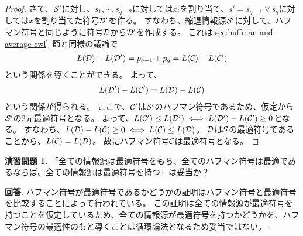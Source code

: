 \documentclass[pdflatex, ja=standard, a4paper]{bxjsarticle}
\theoremstyle{definition}
\newtheorem{problem}{演習問題}
\newenvironment{answer}{\noindent\textbf{回答}.}{\hfill$\square$}
\newcommand{\secref}[1]{\ref{#1}~節}
\begin{document}
\begin{proof}
    さて、$\mathcal{S}'$に対し、$s_1, \cdots, s_{q - 2}$に対しては$x_i$を割り当て、$s' = s_{q - 1} \lor s_q$に対しては$x$を割り当てた符号$\mathcal{D}'$を作る。
    すなわち、縮退情報源$\mathcal{S}'$に対して、ハフマン符号と同じように符号$\mathcal{D}$から$\mathcal{D}'$を作成する。
    これは\secref{sec:huffman-and-average-cwl}と同様の議論で
    \begin{align*}
        L(\mathcal{D}) - L(\mathcal{D}') = p_{q - 1} + p_q = L(\mathcal{C}) - L(\mathcal{C}')
    \end{align*}
    という関係を導くことができる。
    よって、
    \begin{align*}
        L(\mathcal{D}') - L(\mathcal{C}') = L(\mathcal{D}) - L(\mathcal{C})
    \end{align*}
    という関係が得られる。
    ここで、$\mathcal{C}'$は$\mathcal{S}'$のハフマン符号であるため、仮定から$\mathcal{S}'$の2元最適符号となる。
    よって、$L(\mathcal{C}') \leq L(\mathcal{D}') \iff L(\mathcal{D}') - L(\mathcal{C}') \geq 0$となる。
    すなわち、$L(\mathcal{D}) - L(\mathcal{C}) \geq 0 \iff L(\mathcal{C}) \leq L(\mathcal{D})$。
    $\mathcal{D}$は$\mathcal{S}$の最適符号であることから、$L(\mathcal{C}) = L(\mathcal{D})$。
    故にハフマン符号$\mathcal{C}$は最適符号となる。
\end{proof}

\begin{problem}
    「全ての情報源は最適符号をもち、全てのハフマン符号は最適であるならば、全ての情報源は最適符号を持つ」は妥当か？
\end{problem}
\begin{answer}
    ハフマン符号が最適符号であるかどうかの証明はハフマン符号と最適符号を比較することによって行われている。
    この証明は全ての情報源が最適符号を持つことを仮定しているため、全ての情報源が最適符号を持つかどうかを、ハフマン符号の最適性のもと導くことは循環論法となるため妥当ではない。
\end{answer}

\printbibliography[title=参考文献]
\end{document}
